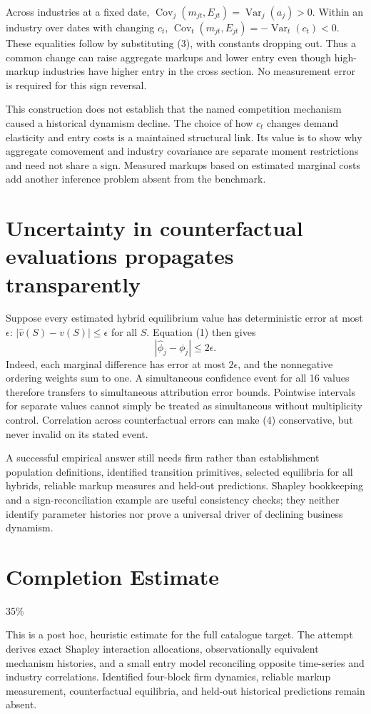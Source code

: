 \documentclass[11pt,a4paper]{article}
\DeclareMathOperator{\Var}{Var}
\DeclareMathOperator{\Cov}{Cov}
\begin{document}
Across industries at a fixed date, $\Cov_j(m_{jt},E_{jt})=\Var_j(a_j)>0$. Within an industry over dates with changing $c_t$, $\Cov_t(m_{jt},E_{jt})=-\Var_t(c_t)<0$. These equalities follow by substituting (3), with constants dropping out. Thus a common change can raise aggregate markups and lower entry even though high-markup industries have higher entry in the cross section. No measurement error is required for this sign reversal.

This construction does not establish that the named competition mechanism caused a historical dynamism decline. The choice of how $c_t$ changes demand elasticity and entry costs is a maintained structural link. Its value is to show why aggregate comovement and industry covariance are separate moment restrictions and need not share a sign. Measured markups based on estimated marginal costs add another inference problem absent from the benchmark.

\section{Uncertainty in counterfactual evaluations propagates transparently}
Suppose every estimated hybrid equilibrium value has deterministic error at most $\epsilon$: $|\widehat v(S)-v(S)|\le\epsilon$ for all $S$. Equation (1) then gives
\[
 |\widehat\phi_j-\phi_j|\le2\epsilon. \tag{4}
\]
Indeed, each marginal difference has error at most $2\epsilon$, and the nonnegative ordering weights sum to one. A simultaneous confidence event for all 16 values therefore transfers to simultaneous attribution error bounds. Pointwise intervals for separate values cannot simply be treated as simultaneous without multiplicity control. Correlation across counterfactual errors can make (4) conservative, but never invalid on its stated event.

A successful empirical answer still needs firm rather than establishment population definitions, identified transition primitives, selected equilibria for all hybrids, reliable markup measures and held-out predictions. Shapley bookkeeping and a sign-reconciliation example are useful consistency checks; they neither identify parameter histories nor prove a universal driver of declining business dynamism.

\section{Completion Estimate}
35\%

This is a post hoc, heuristic estimate for the full catalogue target.
The attempt derives exact Shapley interaction allocations, observationally equivalent mechanism histories, and a small entry model reconciling opposite time-series and industry correlations. Identified four-block firm dynamics, reliable markup measurement, counterfactual equilibria, and held-out historical predictions remain absent.
\end{document}

